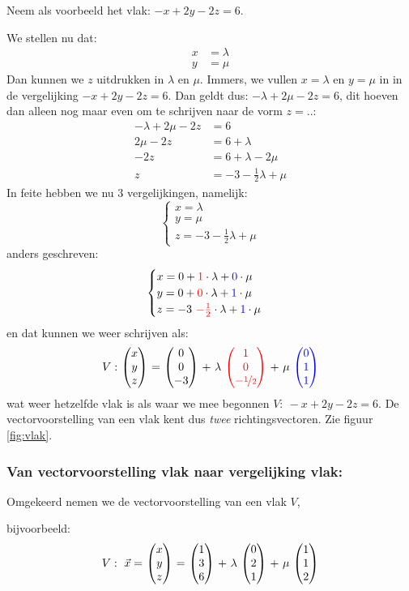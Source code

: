 Neem als voorbeeld het vlak: $ -x + 2y -2z = 6 $. 

We stellen  nu dat:
\begin{align*}
  x &= \lambda \\
  y &= \mu  
\end{align*}
Dan kunnen we $ z$ uitdrukken in $ \lambda $  en $ \mu $. Immers, we vullen  $ x=  \lambda $ en $ y = \mu $ in in de vergelijking $ -x + 2y -2z = 6 $. Dan geldt dus: $ -\lambda + 2\mu -2z = 6 $, dit hoeven dan alleen nog maar even om te schrijven naar de vorm $z = ..$:
\begin{align*}
  -\lambda + 2\mu -2z &= 6 \\
  2\mu -2z &= 6 + \lambda \\
  -2z &= 6 + \lambda - 2\mu \\
  z &= -3 -\frac{1}{2}\lambda + \mu 
\end{align*}
In feite hebben we nu $3$ vergelijkingen, namelijk:
\[\begin{cases}
x =  \lambda\\
y =  \mu\\
z = -3 -\frac{1}{2}\lambda + \mu 
\end{cases}
\] 
anders geschreven:
\[\begin{cases}
x =  0 + {\color{red}1}\cdot\lambda +  {\color{blue}0}\cdot\mu\\
y =  0 +  {\color{red}0}\cdot\lambda  + {\color{blue}1}\cdot \mu\\
z = -3 \  {\color{red}- \frac{1}{2}} \cdot\lambda + {\color{blue}1}\cdot\mu 
\end{cases}
\] 
en dat kunnen we weer schrijven als:
\[V:\ \vecdrie{x}{y}{z} \ = \ \vecdrie{0}{0}{-3} \ + \ \lambda\ \vecdrie[red]{1}{0}{-\nicefrac{1}{2}} \ + \ \mu\ \vecdrie[blue]{0}{1}{1} \] 
wat weer hetzelfde vlak is als waar we mee begonnen $ V: \ -x + 2y -2z = 6 $.
De vectorvoorstelling van een vlak kent dus \textit{twee}  richtingsvectoren. 
Zie  figuur  \ref{fig:vlak}.

\subsubsection{Van vectorvoorstelling vlak naar vergelijking vlak:}
Omgekeerd nemen we de vectorvoorstelling van een vlak $ V $,

bijvoorbeeld:
\[V:\ \vec{x} =\ \vecdrie{x}{y}{z} \ = \ \vecdrie{1}{3}{6} \ + \ \lambda\ \vecdrie{0}{2}{1} \ + \ \mu\ \vecdrie{1}{1}{2} \]

